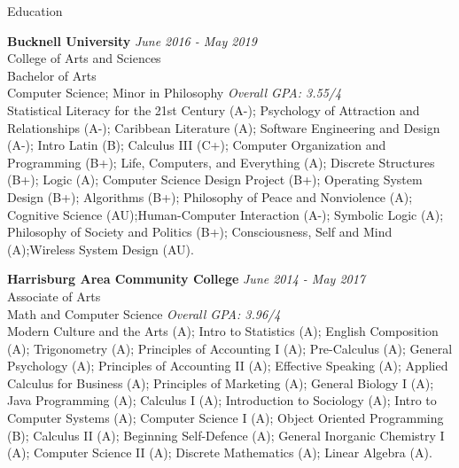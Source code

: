 \documentclass{resume} %
\begin{document}

\begin{rSection}{Education}

{\bf Bucknell University} {\em June 2016 - May 2019} 
\\ College of Arts and Sciences
\\ Bachelor of Arts
\\ Computer Science; Minor in Philosophy  {\em Overall GPA: 3.55/4} \smallskip \\
Statistical Literacy for the 21st Century (A-); Psychology of Attraction and Relationships (A-); Caribbean Literature (A); Software Engineering and Design (A-); Intro Latin (B); Calculus III (C+); Computer Organization and Programming (B+); Life, Computers, and Everything (A); Discrete Structures (B+); Logic (A); Computer Science Design Project (B+); Operating System Design (B+); Algorithms (B+); Philosophy of Peace and Nonviolence (A); Cognitive Science (AU);Human-Computer Interaction (A-); Symbolic Logic (A); Philosophy of Society and Politics (B+); Consciousness, Self and Mind (A);Wireless System Design (AU).


{\bf Harrisburg Area Community College} {\em June 2014 - May 2017} 
\\ Associate of Arts
\\ Math and Computer Science {\em Overall GPA: 3.96/4}
\smallskip \\
Modern Culture and the Arts (A); Intro to Statistics (A); English Composition (A); Trigonometry (A); Principles of Accounting I (A); Pre-Calculus (A); General Psychology (A); Principles of Accounting II (A); Effective Speaking (A);  Applied Calculus for Business (A); Principles of Marketing (A); General Biology I (A); Java Programming (A); Calculus I (A); Introduction to Sociology (A); Intro to Computer Systems (A); Computer Science I (A); Object Oriented Programming (B); Calculus II (A); Beginning Self-Defence (A); General Inorganic Chemistry I (A); Computer Science II (A); Discrete Mathematics (A); Linear Algebra (A).



\end{rSection}
\end{document}
